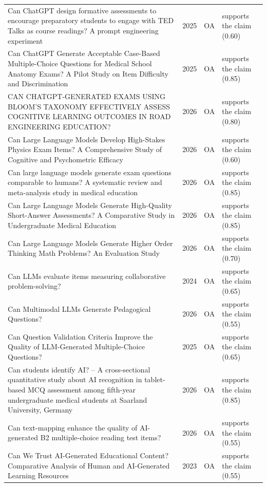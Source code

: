 \begin{longtable}{@{}%
  >{\raggedright\arraybackslash}p{}c%
  >{\raggedright\arraybackslash}p{}%
  >{\raggedright\arraybackslash}p{}@{}}
Can ChatGPT design formative assessments to encourage preparatory students to engage with TED Talks as course readings? A prompt engineering experiment & 2025 & OA & supports the claim (0.60) \\
Can ChatGPT Generate Acceptable Case-Based Multiple-Choice Questions for Medical School Anatomy Exams? A Pilot Study on Item Difficulty and Discrimination & 2025 & OA & supports the claim (0.85) \\
CAN CHATGPT-GENERATED EXAMS USING BLOOM'S TAXONOMY EFFECTIVELY ASSESS COGNITIVE LEARNING OUTCOMES IN ROAD ENGINEERING EDUCATION? & 2026 & OA & supports the claim (0.80) \\
Can Large Language Models Develop High-Stakes Physics Exam Items? A Comprehensive Study of Cognitive and Psychometric Efficacy & 2026 & OA & supports the claim (0.60) \\
Can large language models generate exam questions comparable to humans? A systematic review and meta-analysis study in medical education & 2026 & OA & supports the claim (0.85) \\
Can Large Language Models Generate High-Quality Short-Answer Assessments? A Comparative Study in Undergraduate Medical Education & 2026 & OA & supports the claim (0.85) \\
Can Large Language Models Generate Higher Order Thinking Math Problems? An Evaluation Study & 2026 & OA & supports the claim (0.70) \\
Can LLMs evaluate items measuring collaborative problem-solving? & 2024 & OA & supports the claim (0.65) \\
Can Multimodal LLMs Generate Pedagogical Questions? & 2026 & OA & supports the claim (0.55) \\
Can Question Validation Criteria Improve the Quality of LLM-Generated Multiple-Choice Questions? & 2025 & OA & supports the claim (0.65) \\
Can students identify AI? -- A cross-sectional quantitative study about AI recognition in tablet-based MCQ assessment among fifth-year undergraduate medical students at Saarland University, Germany & 2026 & OA & supports the claim (0.85) \\
Can text-mapping enhance the quality of AI-generated B2 multiple-choice reading test items? & 2026 & OA & supports the claim (0.55) \\
Can We Trust AI-Generated Educational Content? Comparative Analysis of Human and AI-Generated Learning Resources & 2023 & OA & supports the claim (0.55) \\

\end{longtable}
